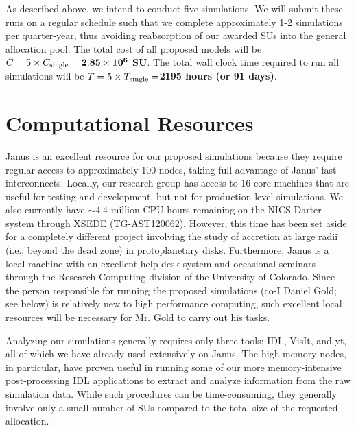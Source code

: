\documentclass[preprint]{aastex}
\begin{document}
As described above, we intend to conduct five simulations.
We will submit these runs on a regular schedule such that we complete approximately 1-2 simulations per quarter-year, thus avoiding reabsorption of our awarded SUs into the general allocation pool.
The total cost of all proposed models will be $C=5 \times C_{\rm single} =\mathbf{2.85 \times 10^6}$ {\bf SU}.
The total wall clock time required to run all simulations will be $T=5 \times T_{\rm single} =${\bf 2195 hours (or 91 days)}.


\vspace{-8mm}
\section{Computational Resources}
\label{sec:computationalresources}
\vspace{-2mm}
{\sc Janus} is an excellent resource for our proposed simulations because they require regular access to approximately 100 nodes, taking full advantage of {\sc Janus}' fast interconnects.
Locally, our research group has access to 16-core machines that are useful for testing and development, but not for production-level simulations.
We also currently have $\sim 4.4$ million CPU-hours remaining on the NICS {\sc Darter} system through XSEDE (TG-AST120062).  However, this time has been set aside for a completely different project involving the study of accretion at large radii (i.e., beyond the dead zone) in protoplanetary disks.  Furthermore,
{\sc Janus} is a local machine with an excellent help desk system and occasional seminars through the Research Computing division of the University of Colorado.  Since the person responsible for running the proposed 
simulations (co-I Daniel Gold; see below) is relatively new to high performance computing, such excellent local resources will be necessary for Mr. Gold to carry out his tasks.

Analyzing our simulations generally requires only three tools: IDL, VisIt, and yt, all of which we have already used extensively on {\sc Janus}.
The high-memory nodes, in particular, have proven useful in running some of our more memory-intensive post-processing IDL applications to extract and analyze information from the raw simulation data.
While such procedures can be time-consuming, they generally involve only a small number of SUs compared to the total size of the requested allocation.

\vspace{-8mm}
\end{document}
